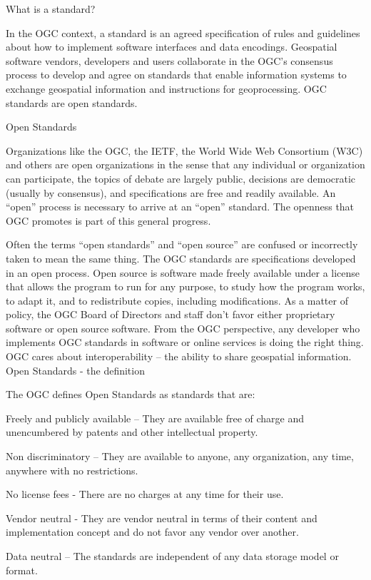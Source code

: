 \documentclass[class=scrbook, crop=false]{standalone}
\begin{document}
What is a standard?

In the OGC context, a standard is an agreed specification of rules and guidelines about how to implement software interfaces and data encodings. Geospatial software vendors, developers and users collaborate in the OGC’s consensus process to develop and agree on standards that enable information systems to exchange geospatial information and instructions for geoprocessing. OGC standards are open standards.


Open Standards

Organizations like the OGC, the IETF, the World Wide Web Consortium (W3C) and others are open organizations in the sense that any individual or organization can participate, the topics of debate are largely public, decisions are democratic (usually by consensus), and specifications are free and readily available. An “open” process is necessary to arrive at an “open” standard. The openness that OGC promotes is part of this general progress.

Often the terms “open standards” and “open source” are confused or incorrectly taken to mean the same thing. The OGC standards are specifications developed in an open process. Open source is software made freely available under a license that allows the program to run for any purpose, to study how the program works, to adapt it, and to redistribute copies, including modifications. As a matter of policy, the OGC Board of Directors and staff don’t favor either proprietary software or open source software. From the OGC perspective, any developer who implements OGC standards in software or online services is doing the right thing. OGC cares about interoperability – the ability to share geospatial information.
Open Standards - the definition

The OGC defines Open Standards as standards that are:

    Freely and publicly available – They are available free of charge and unencumbered by patents and other intellectual property.

    Non discriminatory – They are available to anyone, any organization, any time, anywhere with no restrictions.

    No license fees - There are no charges at any time for their use.

    Vendor neutral - They are vendor neutral in terms of their content and implementation concept and do not favor any vendor over another.

    Data neutral – The standards are independent of any data storage model or format.
\end{document}
